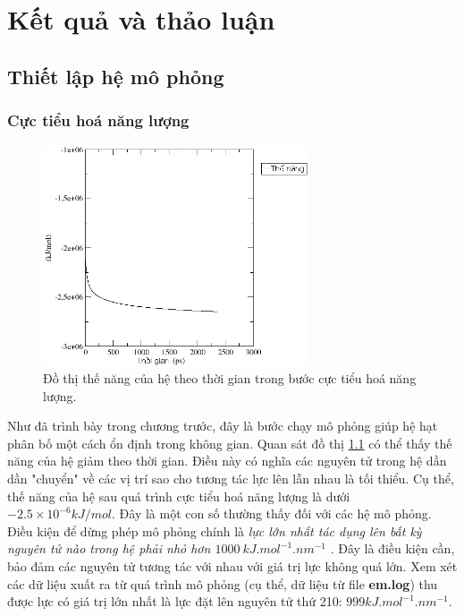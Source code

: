 \documentclass[12pt,a4paper,reqno, oneside]{book}
\begin{document}
\newpage
\pagestyle{fancy}
\setcounter{chapter}{2}
\chapter{Kết quả và thảo luận}

\section{Thiết lập hệ mô phỏng}
	\subsection{Cực tiểu hoá năng lượng}
	\begin{figure}[h]
	\centering
	\includegraphics[width=0.7\textwidth,natwidth=610,natheight=642]{25energy}
	\caption{Đồ thị thế năng của hệ theo thời gian trong bước cực tiểu hoá năng lượng.}
	\label{fig:em}
	\end{figure}
	Như đã trình bày trong chương trước, đây là bước chạy mô phỏng giúp hệ hạt phân bố một cách ổn định trong không gian. Quan sát đồ thị \ref{fig:em} có thể thấy thế năng của hệ giảm theo thời gian. Điều này có nghĩa các nguyên tử trong hệ dần dần "chuyển" về các vị trí sao cho tương tác lực lên lẫn nhau là tối thiểu. Cụ thể, thế năng của hệ sau quá trình cực tiểu hoá năng lượng là dưới $-2.5\times 10^{-6} kJ/mol$. Đây là một con số thường thấy đối với các hệ mô phỏng. Điều kiện để dừng phép mô phỏng chính là \emph{lực lớn nhất tác dụng lên bất kỳ nguyên tử nào trong hệ phải nhỏ hơn $1000\  kJ.mol^{-1}.nm^{-1}$ }. Đây là điều kiện cần, bảo đảm các nguyên tử tương tác với nhau với giá trị lực không quá lớn. Xem xét các dữ liệu xuất ra từ quá trình mô phỏng (cụ thể, dữ liệu từ file \textbf{em.log}) thu được lực có giá trị lớn nhất là lực đặt lên nguyên tử thứ 210: $999 kJ.mol^{-1}.nm^{-1}$.
\end{document}
